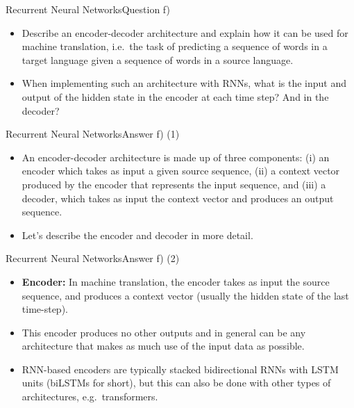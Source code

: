 \documentclass[t]{beamer}
\begin{document}
\begin{frame}{Recurrent Neural Networks}{Question f)}
    \begin{itemize}
        \item Describe an encoder-decoder architecture and explain how it can be
              used for machine translation, i.e.\ the task of predicting a
              sequence of words in a target language given a sequence of words
              in a source language.
        \item When implementing such an architecture with RNNs, what is the
              input and output of the hidden state in the encoder at each time
              step? And in the decoder?
    \end{itemize}
\end{frame}

\begin{frame}{Recurrent Neural Networks}{Answer f) (1)}
    \begin{itemize}
        \item An encoder-decoder architecture is made up of three components: (i)
              an encoder which takes as input a given source sequence, (ii) a
              context vector produced by the encoder that represents the input
              sequence, and (iii) a decoder, which takes as input the context
              vector and produces an output sequence.
        \item Let's describe the encoder and decoder in more detail.
    \end{itemize}
\end{frame}

\begin{frame}{Recurrent Neural Networks}{Answer f) (2)}
    \begin{itemize}
        \item \textbf{Encoder:} In machine translation, the encoder takes as
              input the source sequence, and produces a context vector (usually
              the hidden state of the last time-step).
        \item This encoder produces no other outputs and in general can be any
              architecture that makes as much use of the input data as possible.
        \item RNN-based encoders are typically stacked bidirectional RNNs with
              LSTM units (biLSTMs for short), but this can also be done with
              other types of architectures, e.g.\ transformers.
    \end{itemize}
\end{frame}
\end{document}
